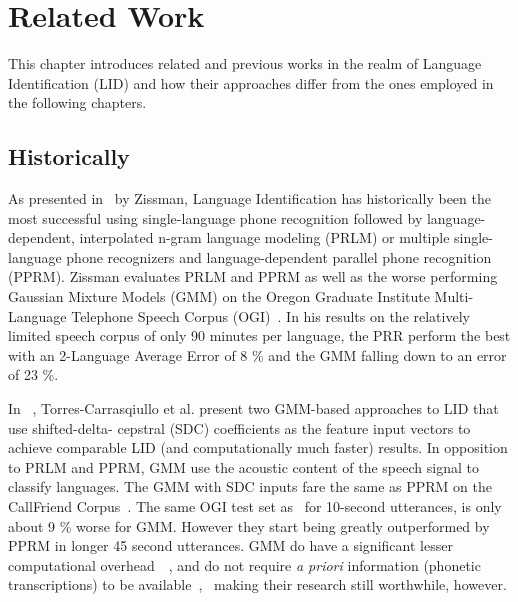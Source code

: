 

\chapter{Related Work}
\label{ch:Related Work}
This chapter introduces related and previous works in the realm of Language Identification (LID) and how their approaches differ from the ones employed in the following chapters.

\section{Historically}

As presented in~\cite{zissman1996comparison} by Zissman, Language Identification has historically been the most successful using single-language phone recognition followed by language-dependent, interpolated n-gram language modeling (PRLM) or multiple single-language phone recognizers and language-dependent parallel phone recognition (PPRM). Zissman evaluates PRLM and PPRM as well as the worse performing Gaussian Mixture Models (GMM) on the Oregon Graduate Institute Multi-Language Telephone Speech Corpus (OGI)~\cite{muthusamy1992ogi}. 
In his results on the relatively limited speech corpus of only 90 minutes per language, the PRR perform the best with an 2-Language Average Error of 8 \% and the GMM falling down to an error of 23 \%.

In ~\cite{torres2002approaches}, Torres-Carrasqiullo et al. present two GMM-based approaches to LID that use shifted-delta- cepstral (SDC) coefficients as the feature input vectors to achieve comparable LID (and computationally much faster) results. In opposition to PRLM and PPRM, GMM use the acoustic content of the speech signal to classify languages. The GMM with SDC inputs fare the same as PPRM on the CallFriend Corpus~\cite{callfriend1996}. The same OGI test set as~\cite{zissman1996comparison} for 10-second utterances, is only about 9 \% worse for GMM. However they start being greatly outperformed by PPRM in longer 45 second utterances. GMM do have a significant lesser computational overhead~\cite{zissman1996comparison}~\cite{torres2002approaches}, and do not require \textit{a priori} information (phonetic transcriptions) to be available~\cite{zissman2001automatic},~\cite{zissman1996comparison} making their research still worthwhile, however.

